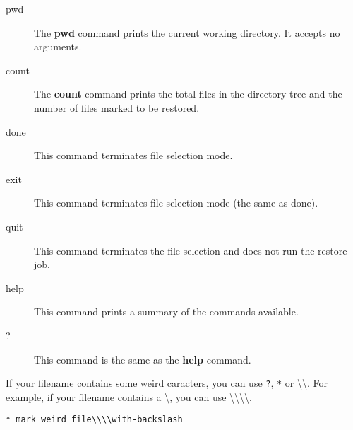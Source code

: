 \begin{description}
\item [pwd]
   The {\bf pwd} command prints the current working  directory. It accepts no
   arguments.

\item [count]
   The {\bf count} command prints the total files in the  directory tree and the
   number of files marked to be restored.

\item [done]
   This command terminates file selection mode.

\item [exit]
   This command terminates file selection mode (the same as  done).

\item [quit]
   This command terminates the file selection and does  not run the restore
job.


\item [help]
   This command prints a summary of the commands available.

\item [?]
   This command is the same as the {\bf help} command.
\end{description}

If your filename contains some weird caracters, you can use \texttt{?},
\texttt{*} or \textbackslash{}\textbackslash{}. For example, if your filename
contains a \textbackslash{}, you can use
\textbackslash{}\textbackslash{}\textbackslash{}\textbackslash{}.

\begin{verbatim}
* mark weird_file\\\\with-backslash
\end{verbatim}

